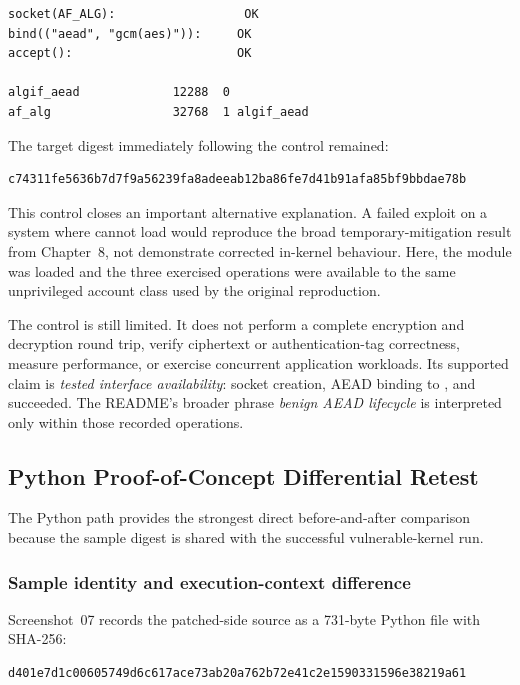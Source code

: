 \begin{lstlisting}
socket(AF_ALG):                  OK
bind(("aead", "gcm(aes)")):     OK
accept():                       OK

algif_aead             12288  0
af_alg                 32768  1 algif_aead
\end{lstlisting}

The target digest immediately following the control remained:

\begin{lstlisting}
c74311fe5636b7d7f9a56239fa8adeeab12ba86fe7d41b91afa85bf9bbdae78b
\end{lstlisting}

This control closes an important alternative explanation. A failed exploit on
a system where  cannot load would reproduce the broad
temporary-mitigation result from Chapter~8, not demonstrate corrected in-kernel
behaviour. Here, the module was loaded and the three exercised operations were
available to the same unprivileged account class used by the original
reproduction.

The control is still limited. It does not perform a complete encryption and
decryption round trip, verify ciphertext or authentication-tag correctness,
measure performance, or exercise concurrent application workloads. Its
supported claim is \emph{tested interface availability}: socket creation, AEAD
binding to , and  succeeded. The README's broader
phrase \emph{benign AEAD lifecycle} is interpreted only within those recorded
operations.

\subsection{Python Proof-of-Concept Differential Retest}

The Python path provides the strongest direct before-and-after comparison
because the sample digest is shared with the successful vulnerable-kernel run.

\subsubsection{Sample identity and execution-context difference}

Screenshot~07 records the patched-side source as a 731-byte Python file with
SHA-256:

\begin{lstlisting}
d401e7d1c00605749d6c617ace73ab20a762b72e41c2e1590331596e38219a61
\end{lstlisting}

